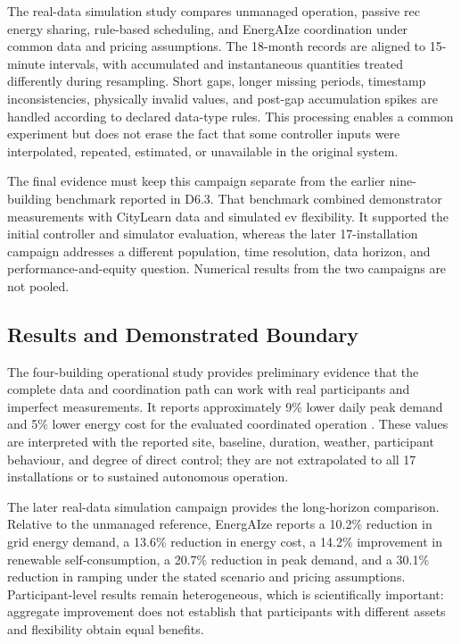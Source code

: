 The real-data simulation study compares unmanaged operation, passive \gls{rec} energy sharing, rule-based scheduling, and EnergAIze coordination under common data and pricing assumptions. The 18-month records are aligned to 15-minute intervals, with accumulated and instantaneous quantities treated differently during resampling. Short gaps, longer missing periods, timestamp inconsistencies, physically invalid values, and post-gap accumulation spikes are handled according to declared data-type rules. This processing enables a common experiment but does not erase the fact that some controller inputs were interpolated, repeated, estimated, or unavailable in the original system.

The final evidence must keep this campaign separate from the earlier nine-building benchmark reported in D6.3. That benchmark combined demonstrator measurements with CityLearn data and simulated \gls{ev} flexibility. It supported the initial controller and simulator evaluation, whereas the later 17-installation campaign addresses a different population, time resolution, data horizon, and performance-and-equity question. Numerical results from the two campaigns are not pooled.

\subsection{Results and Demonstrated Boundary}
\label{sec:opeva-results}

The four-building operational study provides preliminary evidence that the complete data and coordination path can work with real participants and imperfect measurements. It reports approximately 9\% lower daily peak demand and 5\% lower energy cost for the evaluated coordinated operation \parencite{fonseca2025realworldrec}. These values are interpreted with the reported site, baseline, duration, weather, participant behaviour, and degree of direct control; they are not extrapolated to all 17 installations or to sustained autonomous operation.

The later real-data simulation campaign provides the long-horizon comparison. Relative to the unmanaged reference, EnergAIze reports a 10.2\% reduction in grid energy demand, a 13.6\% reduction in energy cost, a 14.2\% improvement in renewable self-consumption, a 20.7\% reduction in peak demand, and a 30.1\% reduction in ramping under the stated scenario and pricing assumptions. Participant-level results remain heterogeneous, which is scientifically important: aggregate improvement does not establish that participants with different assets and flexibility obtain equal benefits.

